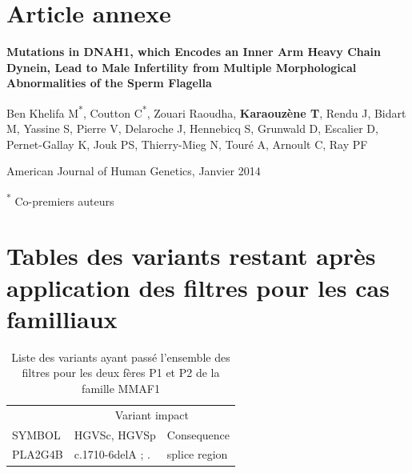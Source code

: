 \documentclass[12pt,a4paper,twoside]{ugathesis}
\theoremstyle{definition}
\theoremstyle{definition}
\theoremstyle{definition}
\theoremstyle{remark}
\begin{document}
\appendix

\hypertarget{dnah12014}{\chapter{Article annexe}\label{dnah12014}}

\textbf{Mutations in DNAH1, which Encodes an Inner Arm Heavy Chain
Dynein, Lead to Male Infertility from Multiple Morphological
Abnormalities of the Sperm Flagella}

Ben Khelifa M\textsuperscript{*}, Coutton C\textsuperscript{*}, Zouari
Raoudha, \textbf{Karaouzène T}, Rendu J, Bidart M, Yassine S, Pierre V,
Delaroche J, Hennebicq S, Grunwald D, Escalier D, Pernet-Gallay K, Jouk
PS, Thierry-Mieg N, Touré A, Arnoult C, Ray PF

American Journal of Human Genetics, Janvier 2014

\textsuperscript{*} Co-premiers auteurs

\newpage



\newpage

\chapter{Tables des variants restant après application des filtres pour
les cas
familliaux}\label{tables-des-variants-restant-apres-application-des-filtres-pour-les-cas-familliaux}

\begin{longtable}[t]{lll}
\caption{\label{tab:tabmmaf1}Liste des variants ayant passé l'ensemble des filtres pour les deux fères P1 et P2 de la famille MMAF1}\\
\toprule
\multicolumn{1}{c}{ } & \multicolumn{2}{c}{Variant impact} \\
\cmidrule(l{2pt}r{2pt}){2-3}
SYMBOL & HGVSc, HGVSp & Consequence\\
\midrule
PLA2G4B & c.1710-6delA ; . & splice region\\
\bottomrule
\end{longtable}
\end{document}
